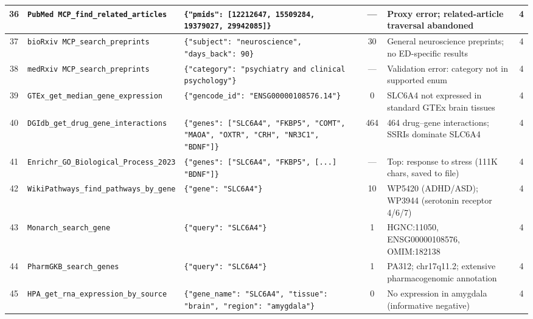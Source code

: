 {\begin{longtable}{@{}c p{2.2cm} p{4.5cm} c p{4cm} c@{}}
36 &
\texttt{PubMed MCP\_\allowbreak find\_related\_\allowbreak articles} &
\texttt{\{"pmids": [12212647, 15509284, 19379027, 29942085]\}} &
--- &
Proxy error; related-article traversal abandoned &
4 \\
\midrule

37 &
\texttt{bioRxiv MCP\_\allowbreak search\_\allowbreak preprints} &
\texttt{\{"subject": "neuroscience", "days\_back": 90\}} &
30 &
General neuroscience preprints; no ED-specific results &
4 \\
\midrule

38 &
\texttt{medRxiv MCP\_\allowbreak search\_\allowbreak preprints} &
\texttt{\{"category": "psychiatry and clinical psychology"\}} &
--- &
Validation error: category not in supported enum &
4 \\
\midrule

39 &
\texttt{GTEx\_get\_\allowbreak median\_gene\_\allowbreak expression} &
\texttt{\{"gencode\_id": "ENSG00000108576.14"\}} &
0 &
SLC6A4 not expressed in standard GTEx brain tissues &
4 \\
\midrule

40 &
\texttt{DGIdb\_get\_\allowbreak drug\_gene\_\allowbreak interactions} &
\texttt{\{"genes": ["SLC6A4", "FKBP5", "COMT", "MAOA", "OXTR", "CRH", "NR3C1", "BDNF"]\}} &
464 &
464 drug--gene interactions; SSRIs dominate SLC6A4 &
4 \\
\midrule

41 &
\texttt{Enrichr\_GO\_\allowbreak Biological\_\allowbreak Process\_2023} &
\texttt{\{"genes": ["SLC6A4", "FKBP5", [...] "BDNF"]\}} &
--- &
Top: response to stress (111K chars, saved to file) &
4 \\
\midrule

42 &
\texttt{WikiPathways\_\allowbreak find\_pathways\_\allowbreak by\_gene} &
\texttt{\{"gene": "SLC6A4"\}} &
10 &
WP5420 (ADHD/ASD); WP3944 (serotonin receptor 4/6/7) &
4 \\
\midrule

43 &
\texttt{Monarch\_\allowbreak search\_gene} &
\texttt{\{"query": "SLC6A4"\}} &
1 &
HGNC:11050, ENSG00000108576, OMIM:182138 &
4 \\
\midrule

44 &
\texttt{PharmGKB\_\allowbreak search\_genes} &
\texttt{\{"query": "SLC6A4"\}} &
1 &
PA312; chr17q11.2; extensive pharmacogenomic annotation &
4 \\
\midrule

45 &
\texttt{HPA\_get\_rna\_\allowbreak expression\_\allowbreak by\_source} &
\texttt{\{"gene\_name": "SLC6A4", "tissue": "brain", "region": "amygdala"\}} &
0 &
No expression in amygdala (informative negative) &
4 \\
\midrule


\end{longtable}}
